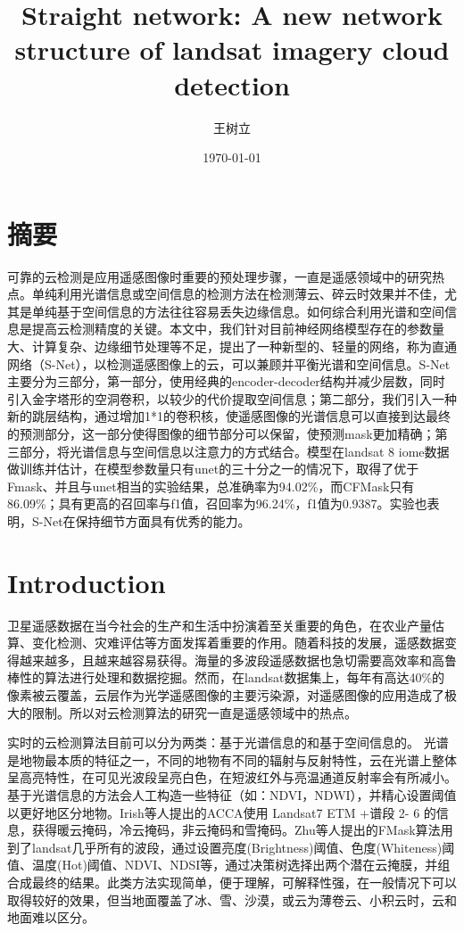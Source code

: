 \documentclass[UTF8]{ctexart}
\begin{document}
\title{Straight network: A new network structure of landsat imagery cloud detection}
\author{王树立}
\date{\today}

\maketitle
\section*{摘要}
可靠的云检测是应用遥感图像时重要的预处理步骤，一直是遥感领域中的研究热点。单纯利用光谱信息或空间信息的检测方法在检测薄云、碎云时效果并不佳，尤其是单纯基于空间信息的方法往往容易丢失边缘信息。如何综合利用光谱和空间信息是提高云检测精度的关键。本文中，我们针对目前神经网络模型存在的参数量大、计算复杂、边缘细节处理等不足，提出了一种新型的、轻量的网络，称为直通网络（S-Net），以检测遥感图像上的云，可以兼顾并平衡光谱和空间信息。S-Net主要分为三部分，第一部分，使用经典的encoder-decoder结构并减少层数，同时引入金字塔形的空洞卷积，以较少的代价提取空间信息；第二部分，我们引入一种新的跳层结构，通过增加1*1的卷积核，使遥感图像的光谱信息可以直接到达最终的预测部分，这一部分使得图像的细节部分可以保留，使预测mask更加精确；第三部分，将光谱信息与空间信息以注意力的方式结合。模型在landsat 8 iome数据做训练并估计，在模型参数量只有unet的三十分之一的情况下，取得了优于Fmask、并且与unet相当的实验结果，总准确率为94.02\%，而CFMask只有86.09\%；具有更高的召回率与f1值，召回率为96.24\%，f1值为0.9387。实验也表明，S-Net在保持细节方面具有优秀的能力。


\section[]{Introduction}
卫星遥感数据在当今社会的生产和生活中扮演着至关重要的角色，在农业产量估算\cite{prasad2006crop}、变化检测\cite{verbesselt2010detecting}、灾难评估\cite{joyce2009review}等方面发挥着重要的作用。随着科技的发展，遥感数据变得越来越多，且越来越容易获得。海量的多波段遥感数据也急切需要高效率和高鲁棒性的算法进行处理和数据挖掘。然而，在landsat数据集上，每年有高达40\%的像素被云覆盖\cite{ju2008availability}，云层作为光学遥感图像的主要污染源，对遥感图像的应用造成了极大的限制。所以对云检测算法的研究一直是遥感领域中的热点。

实时的云检测算法目前可以分为两类：基于光谱信息的和基于空间信息的。
光谱是地物最本质的特征之一，不同的地物有不同的辐射与反射特性，云在光谱上整体呈高亮特性，在可见光波段呈亮白色，在短波红外与亮温通道反射率会有所减小。基于光谱信息的方法\cite{sun2018cloud}会人工构造一些特征（如：NDVI，NDWI），并精心设置阈值以更好地区分地物。Irish等人\cite{irish2006characterization}提出的ACCA使用 Landsat7 ETM +谱段 2- 6 的信息，获得暖云掩码，冷云掩码，非云掩码和雪掩码。Zhu等人提出的FMask算法\cite{zhu2012object}用到了landsat几乎所有的波段，通过设置亮度(Brightness)阈值、色度(Whiteness)阈值、温度(Hot)阈值、NDVI、NDSI等，通过决策树选择出两个潜在云掩膜，并组合成最终的结果。此类方法实现简单，便于理解，可解释性强，在一般情况下可以取得较好的效果，但当地面覆盖了冰、雪、沙漠，或云为薄卷云、小积云时，云和地面难以区分。
\end{document}
